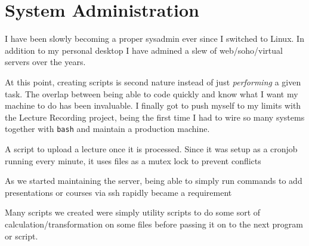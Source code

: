 \section{System Administration}

I have been slowly becoming a proper sysadmin ever since I switched
to Linux. In addition to my personal desktop I have admined a slew of
web/soho/virtual servers over the years.

At this point, creating scripts is second nature instead of just
\emph{performing} a given task. The overlap between being able to code
quickly and know what I want my machine to do has been invaluable. I
finally got to push myself to my limits with the Lecture Recording
project, being the first time I had to wire so many systems together
with \texttt{bash} and maintain a production machine.

{A script to upload a lecture once it is processed.  Since it was setup as a cronjob running every minute, it uses files as a mutex lock to prevent conflicts}

{As we started maintaining the server, being able to simply run commands to add presentations or courses via ssh rapidly became a requirement}

{Many scripts we created were simply utility scripts to do some sort of calculation/transformation on some files before passing it on to the next program or script.}
